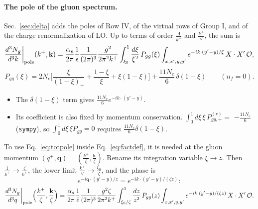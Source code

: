 \documentclass[10pt]{article}
\numberwithin{equation}{section}
\newcommand{\OO}{\mathcal O}
\newcommand{\pre}{\frac{1}{(2\pi)^3}\frac{g^2}{2\pi^2k^+}}
\begin{document}
\paragraph{The pole of the gluon spectrum.} Sec.~\ref{sec:delta} adds the poles of Row IV, of the virtual rows of Group I, and of the charge renormalization of LO. Up to terms of order $\frac{\Lambda}{k^+}$ and $\frac{k^+}{\vee}$, the sum is
\begin{equation}
\frac{d^3N_g}{d^3k}\bigg|_{\rm pole}(k^+,\mathbf k)=\frac{\alpha_s}{2\pi}\frac{1}{\bar\epsilon}\pre\int_{\xi_0}^1\frac{d\xi}{\xi^2}\,P_{gg}(\xi)\int_{x,x',y,y'}e^{-ik\cdot(y'-y)/\xi}\,X\cdot X'\,\OO ,
\label{eq:totpole}
\end{equation}
\begin{equation}
P_{gg}(\xi)=2N_c\Big[\frac{\xi}{(1-\xi)_+}+\frac{1-\xi}{\xi}+\xi(1-\xi)\Big]+\frac{11N_c}{6}\,\delta(1-\xi)\qquad(n_f=0).
\label{eq:Pgg}
\end{equation}
\begin{itemize}
\item The $\delta(1-\xi)$ term gives $\frac{11N_c}{6}e^{-ik\cdot(y'-y)}$.
\item Its coefficient is also fixed by momentum conservation. $\int_0^1d\xi\,\xi\,P^{(r)}_{gg,+}=$ $-\frac{11N_c}{6}$ (\texttt{sympy}), so $\int_0^1d\xi\,\xi P_{gg}=0$ requires $\frac{11N_c}{6}\delta(1-\xi)$.
\end{itemize}
To use Eq.~\eqref{eq:totpole} inside Eq.~\eqref{eq:factdef}, it is needed at the gluon momentum $(q^+,\mathbf q)=(\frac{k^+}{\zeta},\frac{\mathbf k}{\zeta})$. Rename its integration variable $\xi\to z$. Then $\frac{1}{k^+}\to\frac{\zeta}{k^+}$, the lower limit $\frac{k^+}{\vee}\to\frac{\xi_0}{\zeta}$, and the phase is
\begin{equation}
e^{-i\mathbf q\cdot(y'-y)/z}=e^{-ik\cdot(y'-y)/(\zeta z)}:
\end{equation}
\begin{equation}
\frac{d^3N_g}{d^3q}\bigg|_{\rm pole}\Big(\frac{k^+}{\zeta},\frac{\mathbf k}{\zeta}\Big)=\frac{\alpha_s}{2\pi}\frac{1}{\bar\epsilon}\frac{1}{(2\pi)^3}\frac{g^2\zeta}{2\pi^2k^+}\int_{\xi_0/\zeta}^1\frac{dz}{z^2}\,P_{gg}(z)\int_{x,x',y,y'}e^{-ik\cdot(y'-y)/(\zeta z)}\,X\cdot X'\,\OO .
\label{eq:polezeta}
\end{equation}
\end{document}
